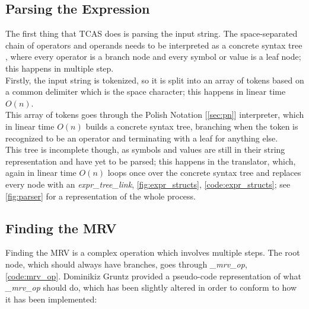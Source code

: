 \documentclass{article}
\theoremstyle{plain}
\theoremstyle{definition}
\theoremstyle{algorithm}
\begin{document}
	\subsection{Parsing the Expression}
	
	The first thing that TCAS does is parsing the input string. The space-separated chain of operators and operands needs to be interpreted as a concrete syntax tree \cite{wiki:parsetree}\cite{wiki:abtree}, where every operator is a branch node and every symbol or value is a leaf node; this happens in multiple step.\\
	Firstly, the input string is tokenized, so it is split into an array of tokens based on a common delimiter which is the space character; this happens in linear time \(O(n)\). \\
	This array of tokens goes through the Polish Notation [\ref{sec:pn}] interpreter, which in linear time \(O(n)\) builds a concrete syntax tree, branching when the token is recognized to be an operator and terminating with a leaf for anything else. \\
	This tree is incomplete though, as symbols and values are still in their string representation and have yet to be parsed; this happens in the translator, which, again in linear time \(O(n)\) loops once over the concrete syntax tree and replaces every node with an \textit{expr\_tree\_link}, \cref{fig:expr_structs}, \cref{code:expr_structs}; see \cref{fig:parser} for a representation of the whole process.
	
	\subsection{Finding the MRV}
	
	Finding the MRV is a complex operation which involves multiple steps. 
	The root node, which should always have branches, goes through \textit{\_mrv\_op}, \cref{code:mrv_op}. Dominikiz Gruntz provided a pseudo-code representation of what \textit{\_mrv\_op} should do, which has been slightly altered in order to conform to how it has been implemented:
	
\end{document}
